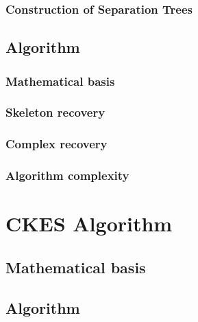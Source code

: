\documentclass{pracamgr}
\theoremstyle{definition}
\begin{document}
		\subsection{Construction of Separation Trees} \label{subsec:SepTreesConstruct}
						
			
	\section{Algorithm}
		
			
		\subsection{Mathematical basis} \label{subsec:LCDMathBasis}
				
	
		\subsection{Skeleton recovery} \label{subsec:LCDSkeletonRecovery}
				
	
		\subsection{Complex recovery} \label{subsec:LCDComplexRecovery}
			
	
		\subsection{Algorithm complexity} \label{subsec:LCDAlgComplex}
			
			
			
\chapter{CKES Algorithm}
	
	

	\section{Mathematical basis} \label{sec:CKESMathBasis}
		

	\section{Algorithm} \label{sec:CKESAlg}
		
		
\end{document}
